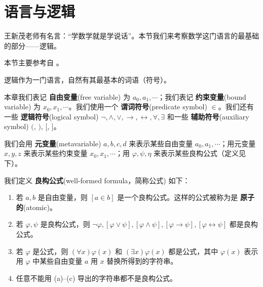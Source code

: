 \section{语言与逻辑}

王新茂老师有名言：“学数学就是学说话”。本节我们来考察数学这门语言的最基础的部分——逻辑。

本节主要参考自 \cite[chp. 1]{takeuti12}。  

逻辑作为一门语言，自然有其最基本的词语（符号）。

\begin{definition}[逻辑的基本符号]\emptyline
  本章我们表记 \textbf{自由变量}(free variable) 为 \(a_0,a_1,\cdots\)；我们表记 \textbf{约束变量}(bound variable) 为 \(x_0,x_1,\cdots\)。我们使用一个 \textbf{谓词符号}(predicate symbol) \(\in\)。我们还有一些 \textbf{逻辑符号}(logical symbol) \(\lnot,\land,\lor,\rightarrow,\leftrightarrow,\forall,\exists\) 和一些 \textbf{辅助符号}(auxiliary symbol) \((\), \()\), \([\), \(]\)。
\end{definition}

\begin{remark}[元变量]
  我们会用 \textbf{元变量}(metavariable) \(a,b,c,d\) 来表示某些自由变量 \(a_0,a_1,\cdots\)；用元变量 \(x,y,z\) 来表示某些约束变量 \(x_0,x_1,\cdots\)；用 \(\varphi,\psi,\eta\) 来表示某些良构公式（定义见下）。
\end{remark}

\begin{definition}[良构公式] \label{def:良构公式}
  我们定义 \textbf{良构公式}(well-formed formula，简称公式) 如下：
  \begin{enumerate}
    \item 若 \(a,b\) 是自由变量，则 \([a\in b]\) 是一个良构公式。这样的公式被称为是 \textbf{原子的}(atomic)。
    \item 若 \(\varphi,\psi\) 是良构公式，则 \(\lnot\varphi,[\varphi\lor\psi],[\varphi\land\psi],[\varphi\rightarrow\psi],[\varphi\leftrightarrow\psi]\) 都是良构公式。
    \item 若 \(\varphi\) 是公式，则 \((\forall x)\varphi(x)\) 和 \((\exists x)\varphi(x)\) 都是公式，其中 \(\varphi(x)\) 表示用 \(\varphi\) 中某些自由变量 \(a\) 用 \(x\) 替换所得到的字符串。
    \item 任意不能用 (a)--(c) 导出的字符串都不是良构公式。
  \end{enumerate}
\end{definition}

